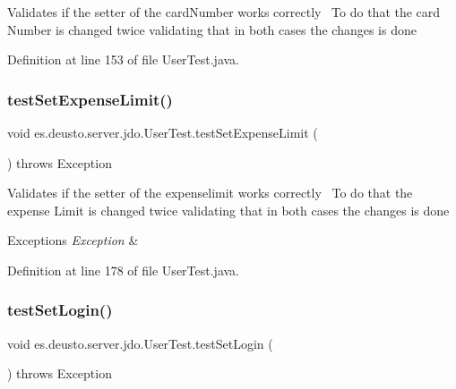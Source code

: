 Validates if the setter of the card\+Number works correctly~\newline
To do that the card Number is changed twice validating that in both cases the changes is done 

Definition at line 153 of file User\+Test.\+java.

\mbox{\label{classes_1_1deusto_1_1server_1_1jdo_1_1_user_test_a62ce453431218996d80c2f0f57249513}} 
\subsubsection{\texorpdfstring{test\+Set\+Expense\+Limit()}{testSetExpenseLimit()}}
{\footnotesize\ttfamily void es.\+deusto.\+server.\+jdo.\+User\+Test.\+test\+Set\+Expense\+Limit (\begin{DoxyParamCaption}{ }\end{DoxyParamCaption}) throws Exception}

Validates if the setter of the expenselimit works correctly~\newline
To do that the expense Limit is changed twice validating that in both cases the changes is done~\newline

\begin{DoxyExceptions}{Exceptions}
{\em Exception} & \\
\hline
\end{DoxyExceptions}


Definition at line 178 of file User\+Test.\+java.

\mbox{\label{classes_1_1deusto_1_1server_1_1jdo_1_1_user_test_abc3bb7420be9628bc36ef599e8d8ee18}} 
\subsubsection{\texorpdfstring{test\+Set\+Login()}{testSetLogin()}}
{\footnotesize\ttfamily void es.\+deusto.\+server.\+jdo.\+User\+Test.\+test\+Set\+Login (\begin{DoxyParamCaption}{ }\end{DoxyParamCaption}) throws Exception}

